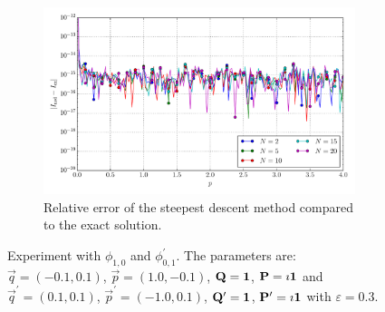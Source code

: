 \documentclass[a4paper,10pt]{article}
\begin{document}
\begin{figure}[ht!]
\begin{subfigure}[t]{0.5\linewidth}
    \includegraphics[width=\linewidth]{./plots/tp_2d_conv_p_(1,0)_(0,1)_err_rel_nsd.pdf}
    \caption{Relative error of the steepest descent method compared to the exact solution.}
    \label{fig:tp_2d_conv_p_10_01_err_rel_nsd}
  \end{subfigure}
  \label{fig:tp_2d_conv_p_10_01}
  \caption{Experiment with $\phi_{1,0}$ and $\phi_{0,1}^{\prime}$.
  The parameters are:
  $\vec{q} = (-0.1,  0.1)$,
  $\vec{p} = ( 1.0, -0.1)$,
  $\mathbf{Q} = \mathbf{1}$,
  $\mathbf{P} = \imath \mathbf{1}$
  and
  $\vec{q}^\prime = ( 0.1, 0.1)$,
  $\vec{p}^\prime = (-1.0, 0.1)$,
  $\mathbf{Q}^\prime = \mathbf{1}$,
  $\mathbf{P}^\prime = \imath \mathbf{1}$
  with $\varepsilon=0.3$.}
\end{figure}
\end{document}
